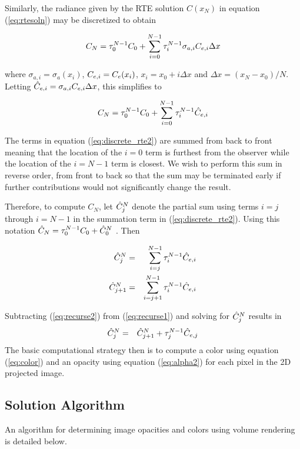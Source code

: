 Similarly, the radiance given by the RTE solution $C(x_N)$ in equation (\ref{eq:rtesoln}) may be discretized to obtain

\begin{eqnarray*}
C_{N} = \tau_{0}^{N-1}C_0 +
\sum_{i=0}^{N-1}\tau_{i}^{N-1}\sigma_{a,i}C_{e,i}\Delta x
\end{eqnarray*}

where $\sigma_{a,i}=\sigma_a(x_i)$, $C_{e,i}=C_e(x_i)$, $x_i=x_0+i\Delta x$ and $\Delta x=(x_N-x_0)/N$.  Letting $\hat{C}_{e,i}=\sigma_{a,i}C_{e,i}\Delta x$, this simplifies to

\begin{equation}
\label{eq:discrete_rte2}
C_N = \tau_{0}^{N-1}C_0 + \sum_{i=0}^{N-1}\tau_{i}^{N-1}\hat{C}_{e,i}
\end{equation}

The terms in equation (\ref{eq:discrete_rte2}) are summed from back to front meaning that the location of the $i=0$ term is furthest from the observer while the location of the $i=N-1$ term is closest.  We wish to perform this sum in reverse order, from front to back so that the sum may be terminated early if further contributions would not significantly change the result.

Therefore, to compute $C_N$, let $\hat{C}_{j}^N$ denote the partial sum using terms $i=j$ through $i=N-1$ in the summation term in (\ref{eq:discrete_rte2}).  Using this notation $\hat{C}_N=\tau_{0}^{N-1}C_0+\hat{C}_{0}^N$ . Then

\begin{eqnarray}
\label{eq:recurse1}
\hat{C}_{j}^N &= &\sum_{i=j}^{N-1}\tau_{i}^{N-1}\hat{C}_{e,i}\\
\label{eq:recurse2}
\hat{C}_{j+1}^N     &= &\sum_{i=j+1}^{N-1}  \tau_{i}^{N-1}\hat{C}_{e,i}
\end{eqnarray}

Subtracting (\ref{eq:recurse2}) from (\ref{eq:recurse1}) and solving for $\hat{C}_{j}^N$ results in
\begin{eqnarray}
\label{eq:color}
\hat{C}_{j}^N&=&\hat{C}_{j+1}^N+\tau_{j}^{N-1}\hat{C}_{e,j}
\end{eqnarray}
The basic computational strategy then is to compute a color using equation (\ref{eq:color}) and an opacity using equation (\ref{eq:alpha2}) for each pixel in the 2D projected image.


\subsection{Solution Algorithm}
An algorithm for determining image opacities and colors using volume rendering is detailed below.

